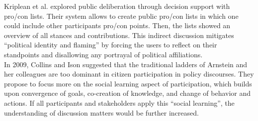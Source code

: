 Kriplean et al. \cite{Kriplean2012_Considerit} explored public deliberation through decision support with pro/con lists. Their system allows to create public pro/con lists in which one could include other participants pro/con points. Then, the lists showed an overview of all stances and contributions. This indirect discussion mitigates ``political identity and flaming'' by forcing the users to reflect on their standpoints and disallowing any portrayal of political affiliations.\\
In 2009, Collins and Ison \cite{Collins2009_social_learning} suggested that the traditional ladders of Arnstein and her colleagues are too dominant in citizen participation in policy discourses. They propose to focus more on the social learning aspect of participation, which builds upon convergence of goals, co-creation of knowledge, and change of behavior and actions. If all participants and stakeholders apply this ``social learning'', the understanding of discussion matters would be further increased.%
